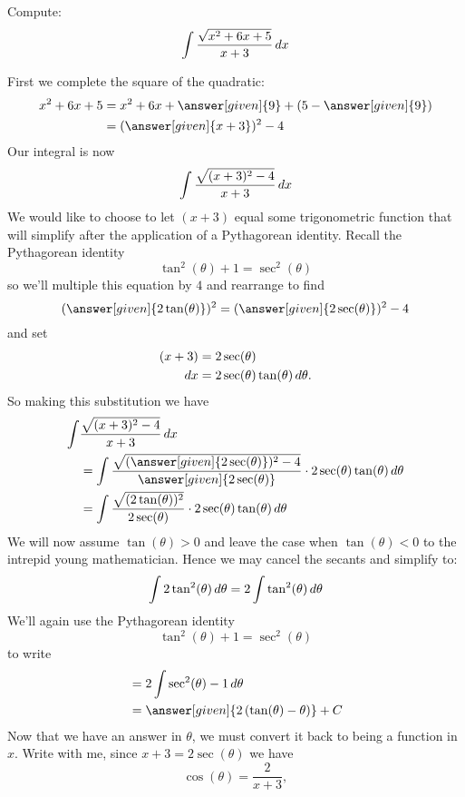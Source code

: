 \documentclass{ximera}
\begin{document}
\begin{example}
  Compute:
  \[
  \int \frac{\sqrt{x^2+6x+5}}{x+3}\mathop{}\!d x
  \]
  \begin{explanation}
    First we complete the square of the quadratic:
    \begin{align*}
      x^2+6x+5 &= x^2+6x+\answer[given]{9}+(5-\answer[given]{9})\\
      &= (\answer[given]{x+3})^2-4
    \end{align*}
    Our integral is now
    \[
    \int \frac{\sqrt{(x+3)^2-4}}{x+3}\mathop{}\!d x
    \]
    We would like to choose to let $(x+3)$ equal some trigonometric
    function that will simplify after the application of a
    Pythagorean identity. Recall the Pythagorean identity
    \[
    \tan^2(\theta) + 1 = \sec^2(\theta)
    \]
    so we'll multiple this equation by $4$ and rearrange to find
    \[
    (\answer[given]{2\tan(\theta)})^2 = (\answer[given]{2\sec(\theta)})^2 - 4
    \]
    and set
    \begin{align*}
      (x+3) &=  2\sec(\theta)\\
      \mathop{}\!d x &= 2\sec(\theta)\tan(\theta) \mathop{}\!d \theta.
    \end{align*}
    So making this substitution we have
    \begin{align*}
      \int &\frac{\sqrt{(x+3)^2-4}}{x+3}\d x \\
      &= \int\frac{\sqrt{(\answer[given]{2\sec(\theta)})^2-4}}{\answer[given]{2\sec(\theta)}} \cdot 2\sec(\theta)\tan(\theta)\d \theta\\
      &= \int\frac{\sqrt{(2\tan(\theta))^2}}{2\sec(\theta)} \cdot 2\sec(\theta)\tan(\theta)\d \theta\\
    \end{align*}
    We will now assume $\tan(\theta)>0$ and leave the case when
    $\tan(\theta)<0$ to the intrepid young mathematician. Hence we may
    cancel the secants and simplify to:
    \[
    \int 2 \tan^2(\theta) \mathop{}\!d \theta = 2\int \tan^2(\theta) \mathop{}\!d \theta
    \]
    We'll again use the Pythagorean identity
    \[
    \tan^2(\theta) + 1 = \sec^2(\theta)
    \]
    to write
    \begin{align*}
      &= 2\int \sec^2(\theta) - 1 \d \theta\\
      &= \answer[given]{2\left(\tan(\theta) - \theta\right)} + C
    \end{align*}
    Now that we have an answer in $\theta$, we must convert it back to
    being a function in $x$. Write
    with me, since $x+3 = 2\sec(\theta)$ we have
    \[
    \cos(\theta) = \frac{2}{x+3},
\]
\end{explanation}
\end{example}
\end{document}
